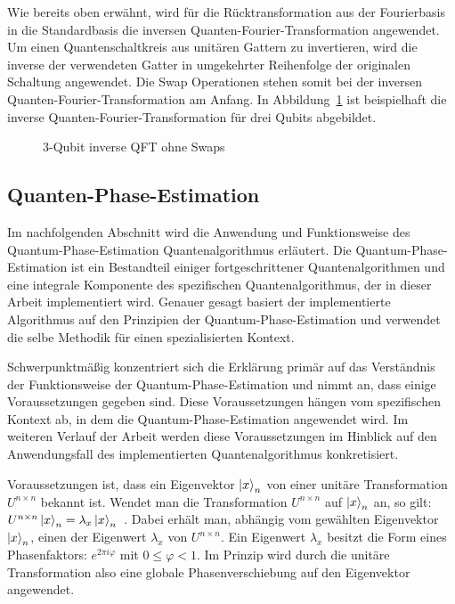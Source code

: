Wie bereits oben erwähnt, 
wird für die Rücktransformation aus der Fourierbasis in die Standardbasis 
die inversen Quanten-Fourier-Transformation angewendet.
Um einen Quantenschaltkreis aus unitären Gattern zu invertieren, 
wird die inverse der verwendeten Gatter
in umgekehrter Reihenfolge der originalen Schaltung angewendet.
Die Swap Operationen stehen somit bei der inversen Quanten-Fourier-Transformation am Anfang.
In Abbildung~\ref{fig:iqft} ist beispielhaft die inverse Quanten-Fourier-Transformation für drei Qubits abgebildet.
\begin{figure}
\caption{3-Qubit inverse QFT ohne Swaps}
\label{fig:iqft}
\centering
\end{figure}

\subsection{Quanten-Phase-Estimation} \label{Quanten-Phase-Estimation}

Im nachfolgenden Abschnitt wird die Anwendung und Funktionsweise des Quantum-Phase-Estimation Quantenalgorithmus erläutert. 
Die Quantum-Phase-Estimation ist ein Bestandteil einiger fortgeschrittener Quantenalgorithmen und eine integrale Komponente des spezifischen Quantenalgorithmus, 
der in dieser Arbeit implementiert wird. 
Genauer gesagt basiert der implementierte Algorithmus auf den Prinzipien der Quantum-Phase-Estimation und verwendet die selbe Methodik für einen spezialisierten Kontext.

Schwerpunktmäßig konzentriert sich die Erklärung primär auf das Verständnis der Funktionsweise der Quantum-Phase-Estimation und nimmt an, dass einige Voraussetzungen gegeben sind. 
Diese Voraussetzungen hängen vom spezifischen Kontext ab, 
in dem die Quantum-Phase-Estimation angewendet wird. 
Im weiteren Verlauf der Arbeit werden diese Voraussetzungen im Hinblick auf den Anwendungsfall des implementierten Quantenalgorithmus konkretisiert.

Voraussetzungen ist, dass ein Eigenvektor \(\ket{x}_n\) von einer unitäre Transformation \(U^{n\times n}\) bekannt ist.
Wendet man die Transformation \(U^{n\times n}\) auf \(\ket{x}_n\) an, 
so gilt: \(U^{n\times n}\ket{x}_n=\lambda_x\ket{x}_n\)~\cite{nielsen_chuang_2010}.
Dabei erhält man, abhängig vom gewählten Eigenvektor \(\ket{x}_n\), einen der Eigenwert \(\lambda_x\) von \(U^{n\times n}\).
Ein Eigenwert \(\lambda_x\) besitzt die Form eines Phasenfaktors: \(e^{2\pi i \varphi}\)
mit \(0 \leq \varphi < 1\).
Im Prinzip wird durch die unitäre Transformation also eine globale Phasenverschiebung auf den Eigenvektor angewendet.

